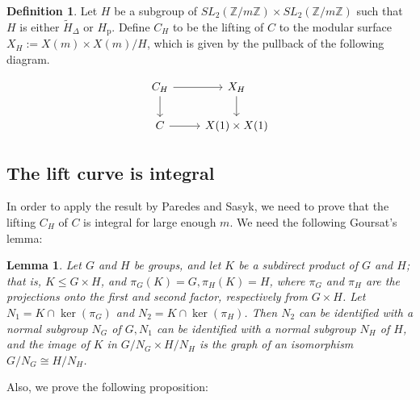 \documentclass[12pt]{amsart}
\newtheorem{lem}[thm]{Lemma}
\theoremstyle{definition}
\newtheorem{defn}[thm]{Definition}
\theoremstyle{remark}
\numberwithin{equation}{section}
\newcommand{\Z}{\mathbb{Z}}
\begin{document}
\begin{defn}
Let $H$ be a subgroup of $SL_{2}(\Z/m\Z) \times SL_{2}(\Z/m\Z)$ such that $H$ is either $\tilde{H}_{\Delta}$ or $H_{\operatorname{p}}$. Define $C_{H}$ to be the lifting of $C$ to the modular surface $X_{H}:= X(m) \times X(m)/H$, which is given by the pullback of the following diagram. 
 
 
$$\begin{tikzcd}\label{dia1}
C_{H} \arrow[r] \arrow[d] &  X_{H}  \arrow[d]  \\
C \arrow[r] & X(1) \times X(1)  	
\end{tikzcd}$$

\end{defn}
\subsection{The lift curve is integral}
In order to apply the result by Paredes and Sasyk, we need to prove that the lifting $C_{H}$ of $C$ is integral for large enough $m$. We need the following Goursat's lemma:
	  
	   \begin{lem}\cite[Theorem 5.5.1]{Hall}\label{Hall}
	   Let $G$ and $H$ be groups, and let $K$ be a subdirect product of $G$ and $H$; that is, $K \leq G \times H$, and $\pi_G(K)=G, \pi_H(K)=H$, where $\pi_G$ and $\pi_H$ are the projections onto the first and second factor, respectively from $G \times H$. Let $N_1=K \cap \operatorname{ker}\left(\pi_G\right)$ and $N_2=K \cap \operatorname{ker}\left(\pi_H\right)$. Then $N_2$ can be identified with a normal subgroup $N_G$ of $G, N_1$ can be identified with a normal subgroup $N_H$ of $H$, and the image of $K$ in $G / N_G \times H / N_H$ is the graph of an isomorphism $G / N_G \cong H / N_H$.
\end{lem}

Also, we prove the following proposition:
\end{document}
